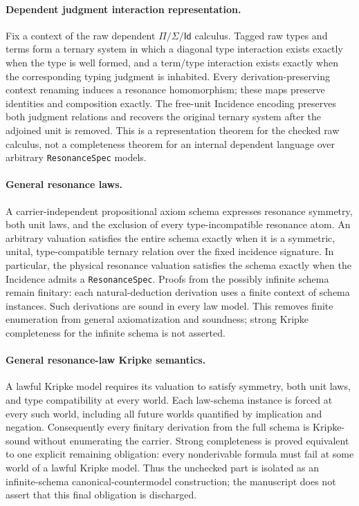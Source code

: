 \documentclass[11pt]{article}
\theoremstyle{definition}
\begin{document}
\paragraph{Dependent judgment interaction representation.}
Fix a context of the raw dependent $\Pi/\Sigma/\mathsf{Id}$ calculus. Tagged
raw types and terms form a ternary system in which a diagonal type interaction
exists exactly when the type is well formed, and a term/type interaction exists
exactly when the corresponding typing judgment is inhabited. Every
derivation-preserving context renaming induces a resonance homomorphism; these
maps preserve identities and composition exactly. The free-unit Incidence
encoding preserves both judgment relations and recovers the original ternary
system after the adjoined unit is removed. This is a representation theorem
for the checked raw calculus, not a completeness theorem for an internal
dependent language over arbitrary \texttt{ResonanceSpec} models.

\paragraph{General resonance laws.}
A carrier-independent propositional axiom schema expresses resonance symmetry,
both unit laws, and the exclusion of every type-incompatible resonance atom.
An arbitrary valuation satisfies the entire schema exactly when it is a
symmetric, unital, type-compatible ternary relation over the fixed incidence
signature. In particular, the physical resonance valuation satisfies the
schema exactly when the Incidence admits a \texttt{ResonanceSpec}. Proofs from
the possibly infinite schema remain finitary: each natural-deduction derivation
uses a finite context of schema instances. Such derivations are sound in every
law model. This removes finite enumeration from general axiomatization and
soundness; strong Kripke completeness for the infinite schema is not asserted.

\paragraph{General resonance-law Kripke semantics.}
A lawful Kripke model requires its valuation to satisfy symmetry, both unit
laws, and type compatibility at every world. Each law-schema instance is
forced at every such world, including all future worlds quantified by
implication and negation. Consequently every finitary derivation from the full
schema is Kripke-sound without enumerating the carrier. Strong completeness is
proved equivalent to one explicit remaining obligation: every nonderivable
formula must fail at some world of a lawful Kripke model. Thus the unchecked
part is isolated as an infinite-schema canonical-countermodel construction;
the manuscript does not assert that this final obligation is discharged.
\end{document}
